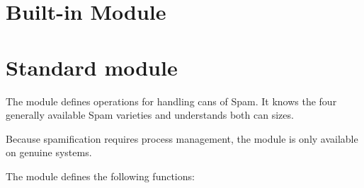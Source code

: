 


\section{Built-in Module }	%

\section{Standard module }	%

\label{module-spam}


The  module defines operations for handling cans of Spam.
It knows the four generally available Spam varieties and understands
both can sizes.

Because spamification requires \UNIX{} process management, the module
is only available on genuine \UNIX{} systems.



The  module defines the following functions:


\renewcommand{\indexsubitem}{(in module spam)}

